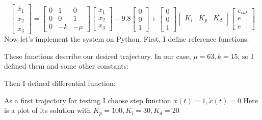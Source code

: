 \documentclass[a4paper,12pt]{article}
\begin{document}
    \begin{equation*}
        \begin{bmatrix}
            \dot{x_1}\\
            \dot{x_2}\\
            \dot{x_3}
        \end{bmatrix}
        =
        \begin{bmatrix}
            0 & 1 & 0\\
            0 & 0 & 1\\
            0 & -k & -\mu
        \end{bmatrix}
        \begin{bmatrix}
            x_1\\
            x_2\\
            x_3
        \end{bmatrix}
        - 9.8
        \begin{bmatrix}
            0\\
            0\\
            1
        \end{bmatrix}
        +
        \begin{bmatrix}
            0\\
            0\\
            1
        \end{bmatrix}
        \begin{bmatrix}
            K_i & K_p & K_d
        \end{bmatrix}
        \begin{bmatrix}
            e_{int}\\
            e\\
            \dot{e}
        \end{bmatrix}
    \end{equation*}
    Now let's implement the system on Python. First, I define reference functions:
    
    These functions describe our desired trajectory. 
    In our case, $\mu = 63, k = 15$, so I defined them and some other constants:
    
    Then I defined differential function:
    
    As a first trajectory for testing I choose step function $x(t)=1, \dot x(t)=0$
    Here is a plot of its solution with $K_p = 100, K_i = 30, K_d = 20$
\end{document}
